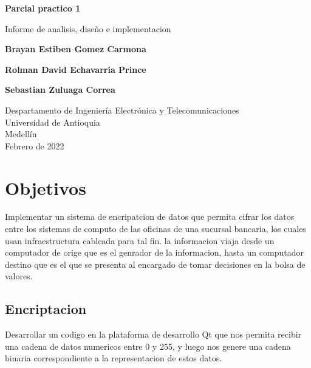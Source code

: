 \documentclass{article}
\begin{document}
\begin{titlepage}
    \begin{center}
        \vspace*{1cm}
            
        \Huge
        \textbf{Parcial practico 1}
            
        \vspace{0.5cm}
        \LARGE
        Informe de analisis, diseño e implementacion
            
        \vspace{1.5cm}
            
        \textbf{Brayan Estiben Gomez Carmona}
        
        \vspace{0.5cm}
        
        \LARGE
        \textbf{Rolman David Echavarria Prince}
        
        \vspace{0.5cm}
        
        \LARGE
        \textbf{Sebastian Zuluaga Correa}

        \vfill
            
        \vspace{0.8cm}
            
        \Large
        Despartamento de Ingeniería Electrónica y Telecomunicaciones\\
        Universidad de Antioquia\\
        Medellín\\
        Febrero de 2022
            
    \end{center}
\end{titlepage}

\tableofcontents

\newpage
\section{Objetivos}\label{intro}
Implementar un sistema de encripatcion de datos que permita cifrar los datos entre los sistemas de computo de las oficinas de una sucursal bancaria, los cuales usan infraestructura cableada para tal fin. la informacion viaja desde un computador de orige que es el genrador de la informacion, hasta un computador destino que es el que se presenta al encargado de tomar decisiones en la bolsa de valores.

\subsection{Encriptacion}
Desarrollar un codigo en la plataforma de desarrollo Qt que nos permita recibir una cadena de datos numericos entre 0 y 255, y luego nos genere una cadena binaria correspondiente a la representacion de estos datos.
\end{document}
